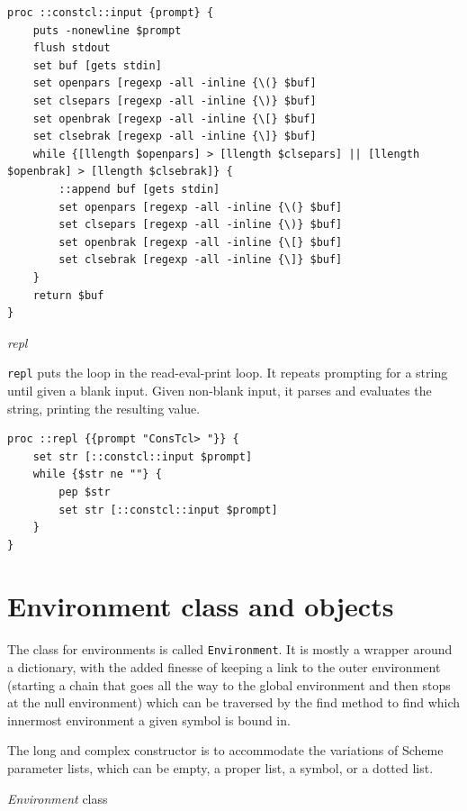\documentclass[twoside,9pt]{report}
\begin{document}
\noindent\makebox[\linewidth]{\rule{\linewidth}{0.4pt}}
\begin{lstlisting}
proc ::constcl::input {prompt} {
    puts -nonewline $prompt
    flush stdout
    set buf [gets stdin]
    set openpars [regexp -all -inline {\(} $buf]
    set clsepars [regexp -all -inline {\)} $buf]
    set openbrak [regexp -all -inline {\[} $buf]
    set clsebrak [regexp -all -inline {\]} $buf]
    while {[llength $openpars] > [llength $clsepars] || [llength $openbrak] > [llength $clsebrak]} {
        ::append buf [gets stdin]
        set openpars [regexp -all -inline {\(} $buf]
        set clsepars [regexp -all -inline {\)} $buf]
        set openbrak [regexp -all -inline {\[} $buf]
        set clsebrak [regexp -all -inline {\]} $buf]
    }
    return $buf
}
\end{lstlisting}
\noindent\makebox[\linewidth]{\rule{\linewidth}{0.4pt}}

\emph{repl}


\texttt{repl} puts the loop in the read-eval-print loop. It repeats prompting for a string until given a blank input. Given non-blank input, it parses and evaluates the string, printing the resulting value.

\noindent\makebox[\linewidth]{\rule{\linewidth}{0.4pt}}
\begin{lstlisting}
proc ::repl {{prompt "ConsTcl> "}} {
    set str [::constcl::input $prompt]
    while {$str ne ""} {
        pep $str
        set str [::constcl::input $prompt]
    }
}
\end{lstlisting}
\noindent\makebox[\linewidth]{\rule{\linewidth}{0.4pt}}
\chapter{Environment class and objects}
\label{environment-class-and-objects}

The class for environments is called \texttt{Environment}. It is mostly a wrapper around a dictionary, with the added finesse of keeping a link to the outer environment (starting a chain that goes all the way to the global environment and then stops at the null environment) which can be traversed by the find method to find which innermost environment a given symbol is bound in.


The long and complex constructor is to accommodate the variations of Scheme parameter lists, which can be empty, a proper list, a symbol, or a dotted list.


\emph{Environment} class
\end{document}
